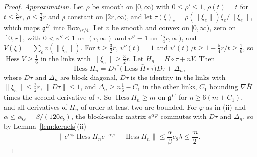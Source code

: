 \documentclass[11pt]{amsart}
\theoremstyle{definition}
\theoremstyle{remark}
\numberwithin{equation}{section}
\newcommand{\g}{\mathfrak{g}}
\begin{document}
\begin{proof}
\emph{Approximation.} Let $\rho$ be smooth on $[0,\infty)$ with $0\le\rho'
\le1$, $\rho(t)=t$ for $t\le\frac32r$, $\rho\le\frac74r$ and $\rho$
constant on $[2r,\infty)$, and let
$\tau(\xi)_e=\rho(\lVert\xi_e\rVert)\xi_e/\lVert\xi_e\rVert$, which maps
$\g^{L'}$ into $\mathrm{Box}_{7r/4}$. Let $v$ be smooth and convex on
$[0,\infty)$, zero on $[0,r]$, with $0<v''\le1$ on $(r,\infty)$ and
$v''=1$ on $[\frac54r,\infty)$, and $V(\xi)=\sum_ev(\lVert\xi_e\rVert)$.
For $t\ge\frac32r$, $v''(t)=1$ and $v'(t)/t\ge1-\frac54r/t\ge\frac16$, so
$\operatorname{Hess}V\ge\frac16$ in the links with $\lVert\xi_e\rVert\ge
\frac32r$. Let $H_n=\bar H\circ\tau+nV$. Then
\[
\operatorname{Hess}H_n=D\tau^*\bigl(\operatorname{Hess}\bar H\circ\tau
\bigr)D\tau+\Delta_n,
\]
where $D\tau$ and $\Delta_n$ are block diagonal, $D\tau$ is the identity in
the links with $\lVert\xi_e\rVert\le\frac32r$, $\lVert D\tau\rVert\le1$, and
$\Delta_n\ge n\frac16-C_1$ in the other links, $C_1$ bounding $\nabla\bar H$
times the second derivative of $\tau$. So $\operatorname{Hess}H_n\ge m$ on
$\g^{L'}$ for $n\ge6(m+C_1)$, and all derivatives of $H_n$ of order at least
two are bounded. For $\varphi$ as in (ii) and $\alpha\le\alpha_G=\beta/(120
c_8)$, the block-scalar matrix $e^{\alpha\varphi}$ commutes with $D\tau$
and $\Delta_n$, so by Lemma~\ref{lem:kernels}(ii)
\[
\bigl\lVert e^{\alpha\varphi}\operatorname{Hess}H_ne^{-\alpha\varphi}-
\operatorname{Hess}H_n\bigr\rVert\le\frac\alpha\beta c_8\lambda\le\frac m2 .
\]


\end{proof}
\end{document}
